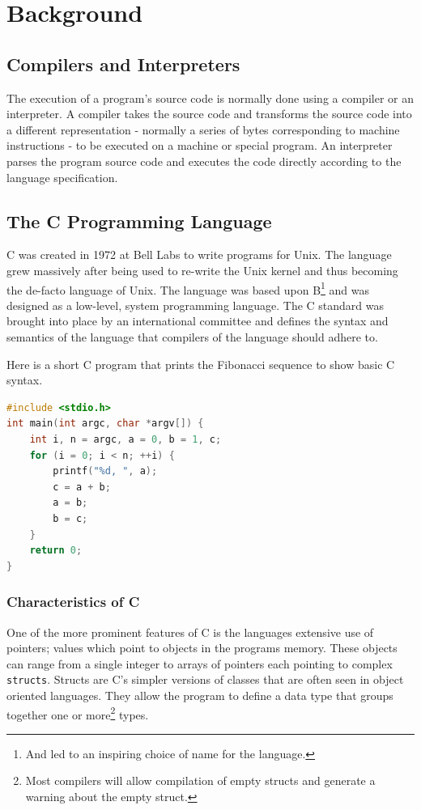 
\chapter{Background}\label{background}


\section{Compilers and Interpreters}\label{compilers}
The execution of a program's source code is normally done using a compiler or an interpreter\cite{compilers-interpreters}. A compiler takes the source code and transforms the source code into a different representation - normally a series of bytes corresponding to machine instructions - to be executed on a machine or special program. An interpreter parses the program source code and executes the code directly according to the language specification.

\section{The C Programming Language}

C was created in 1972 at Bell Labs\cite{ritchie1993development} to write programs for Unix. The language grew massively after being used to re-write the Unix kernel and thus becoming the de-facto language of Unix. The language was based upon B\footnote{And led to an inspiring choice of name for the language.} and was designed as a low-level, system programming language. The C standard was brought into place by an international committee\cite{iso_standard} and defines the syntax and semantics of the language that compilers of the language should adhere to.

Here is a short C program that prints the Fibonacci sequence to show basic C syntax.

\begin{lstlisting}[language=C, caption=Example C program]
#include <stdio.h>
int main(int argc, char *argv[]) {
    int i, n = argc, a = 0, b = 1, c;
    for (i = 0; i < n; ++i) {
        printf("%d, ", a);
        c = a + b;
        a = b;
        b = c;
    }
    return 0;
}
\end{lstlisting}

\subsection{Characteristics of C}
One of the more prominent features of C is the languages extensive use of pointers\cite{tutorials-point}; values which point to objects in the programs memory. These objects can range from a single integer to arrays of pointers each pointing to complex \texttt{structs}. Structs are C's simpler versions of classes that are often seen in object oriented languages. They allow the program to define a data type that groups together one or more\footnote{Most compilers will allow compilation of empty structs and generate a warning about the empty struct.} types.

